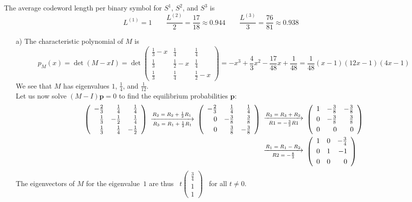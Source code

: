 \documentclass[11pt]{article}
\renewcommand{\vec}[1]{\mathbf{#1}}
\newcommand{\vc}[1]{\begin{pmatrix}#1\end{pmatrix}}
\newcommand{\tmat}[1]{{\left(\begin{array}{rrr}#1\end{array}\right)}}
\newcommand{\dra}[2]{\begin{array}{c}\xrightarrow{\text{\scriptsize$#1$}}\\[-2mm]{\text{\scriptsize$#2$}}\end{array}}
\begin{document}
The average codeword length per binary symbol for $S^1$, $S^2$, and $S^3$ is
\[
        L^{(1)} = 1\qquad
  \frac{L^{(2)}}{2} = \frac{17}{18} \approx 0.944\qquad
  \frac{L^{(3)}}{3} = \frac{76}{81} \approx 0.938\qquad
\]

\newpage{}
\begin{itemize}
  \item[{a)}] The characteristic polynomial of $M$ is
    \[
      p_M(x) = \det(M-xI)
             = \det \tmat{\frac{1}{3}-x & \frac{1}{4}   & \frac{1}{4}\\[1mm]
                          \frac{1}{3}   & \frac{1}{2}-x & \frac{1}{4}\\[1mm]
                          \frac{1}{3}   & \frac{1}{4}   & \frac{1}{2}-x}
             = -x^3 + \frac{4}{3}x^2 - \frac{17}{48}x + \frac{1}{48}
             = \frac{1}{48}(x-1)(12x - 1)(4x - 1)
    \]
    We see that $M$ has eigenvalues $1$, $\frac{1}{4}$, and $\frac{1}{12}$.\\
    Let us now solve $(M-I)\vec{p} = 0$ to find the equilibrium probabilities $\vec{p}$:
   \begin{align*}
    \tmat{-\frac{2}{3} &  \frac{1}{4} &  \frac{1}{4}\\[1mm]
           \frac{1}{3} & -\frac{1}{2} &  \frac{1}{4}\\[1mm]
           \frac{1}{3} &  \frac{1}{4} & -\frac{1}{2}}
    \dra{R_2 = R_2 + \frac{1}{2} R_1}{R_3 = R_1 + \frac{1}{2} R_1}
    \tmat{-\frac{2}{3} &  \frac{1}{4} &  \frac{1}{4}\\[1mm]
               0       & -\frac{3}{8} &  \frac{3}{8}\\[1mm]
               0       &  \frac{3}{8} & -\frac{3}{8}}
    \dra{R_3 = R_3 + R_2}{R1 = -\frac{3}{2}R1}
   &\tmat{     1       & -\frac{3}{8} & -\frac{3}{8}\\[1mm]
               0       & -\frac{3}{8} &  \frac{3}{8}\\[1mm]
               0       &     0        &      0}\\
    \dra{R_1 = R_1 - R_2}{R2 = -\frac{8}{3}}
   &\tmat{     1       &     0        & -\frac{3}{4}\\[1mm]
               0       &     1        &  -1         \\[1mm]
               0       &     0        &      0}
   \end{align*}
   The eigenvectors of $M$ for the eigenvalue~$1$ are thus \, $t\vc{\frac{3}{4}\\1\\1}$ \, for all $t\neq 0$.

\end{itemize}
\end{document}
